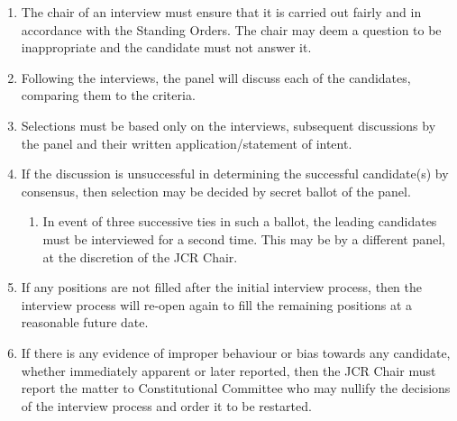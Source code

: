 \documentclass[12pt]{article}  %
\begin{document}
\begin{enumerate}
\begin{enumerate}
    \end{enumerate}
    \item The chair of an interview must ensure that it is carried out fairly and in accordance with the Standing Orders. The chair may deem a question to be inappropriate and the candidate must not answer it.
    \item Following the interviews, the panel will discuss each of the candidates, comparing them to the criteria.
    \item Selections must be based only on the interviews, subsequent discussions by the panel and their written application/statement of intent.
    \item If the discussion is unsuccessful in determining the successful candidate(s) by consensus, then selection may be decided by secret ballot of the panel.
    \begin{enumerate}
        \item In event of three successive ties in such a ballot, the leading candidates must be interviewed for a second time. This may be by a different panel, at the discretion of the JCR Chair.
    \end{enumerate}
    \item If any positions are not filled after the initial interview process, then the interview process will re-open again to fill the remaining positions at a reasonable future date.
    \item If there is any evidence of improper behaviour or bias towards any candidate, whether immediately apparent or later reported, then the JCR Chair must report the matter to Constitutional Committee who may nullify the decisions of the interview process and order it to be restarted.
\end{enumerate}
\newpage
\end{document}
